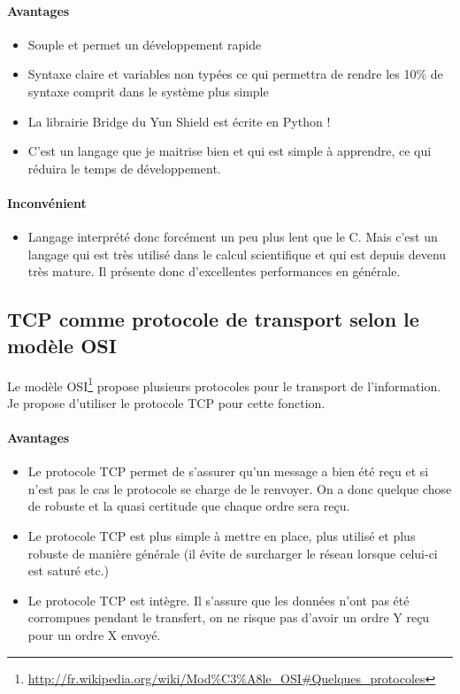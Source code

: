 \paragraph{Avantages}
\begin{itemize}
\item Souple et permet un développement rapide
\item Syntaxe claire et variables non typées ce qui permettra de rendre les 10\% de syntaxe comprit dans le système plus simple
\item La librairie Bridge du Yun Shield est écrite en Python !
\item C'est un langage que je maitrise bien et qui est simple à apprendre, ce qui réduira le temps de développement.
\end{itemize}
\paragraph{Inconvénient}
\begin{itemize}
\item Langage interprété donc forcément un peu plus lent que le C. Mais c'est un langage qui est très utilisé dans le calcul scientifique et qui est depuis devenu très mature. Il présente donc d'excellentes performances en générale.
\end{itemize}

\subsection{TCP comme protocole de transport selon le modèle OSI}
Le modèle OSI\footnote{\url{http://fr.wikipedia.org/wiki/Mod\%C3\%A8le_OSI\#Quelques_protocoles}} propose plusieurs protocoles pour le transport de l'information.\\
Je propose d'utiliser le protocole TCP pour cette fonction.
\paragraph{Avantages}
\begin{itemize}
\item Le protocole TCP permet de s'assurer qu'un message a bien été reçu et si n'est pas le cas le protocole se charge de le renvoyer. On a donc quelque chose de robuste et la quasi certitude que chaque ordre sera reçu.
\item Le protocole TCP est plus simple à mettre en place, plus utilisé et plus robuste de manière générale (il évite de surcharger le réseau lorsque celui-ci est saturé etc.)
\item Le protocole TCP est intègre. Il s'assure que les données n'ont pas été corrompues pendant le transfert, on ne risque pas d'avoir un ordre Y reçu pour un ordre X envoyé.
\end{itemize}
